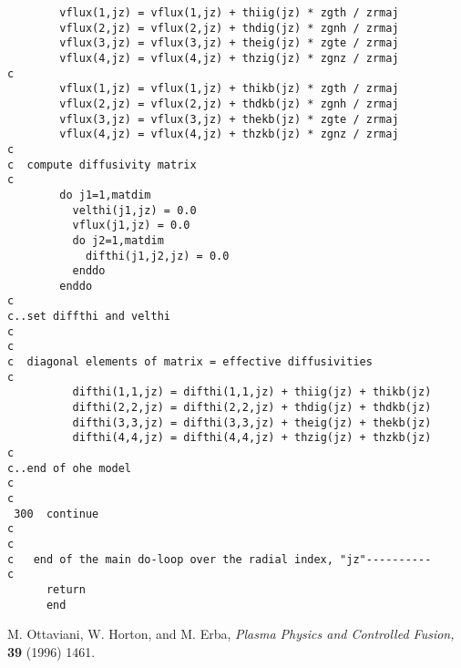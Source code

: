 \begin{verbatim}
        vflux(1,jz) = vflux(1,jz) + thiig(jz) * zgth / zrmaj
        vflux(2,jz) = vflux(2,jz) + thdig(jz) * zgnh / zrmaj
        vflux(3,jz) = vflux(3,jz) + theig(jz) * zgte / zrmaj
        vflux(4,jz) = vflux(4,jz) + thzig(jz) * zgnz / zrmaj
c
        vflux(1,jz) = vflux(1,jz) + thikb(jz) * zgth / zrmaj
        vflux(2,jz) = vflux(2,jz) + thdkb(jz) * zgnh / zrmaj
        vflux(3,jz) = vflux(3,jz) + thekb(jz) * zgte / zrmaj
        vflux(4,jz) = vflux(4,jz) + thzkb(jz) * zgnz / zrmaj
c
c  compute diffusivity matrix
c
        do j1=1,matdim
          velthi(j1,jz) = 0.0
          vflux(j1,jz) = 0.0
          do j2=1,matdim
            difthi(j1,j2,jz) = 0.0
          enddo
        enddo
c
c..set diffthi and velthi
c
c
c  diagonal elements of matrix = effective diffusivities
c
          difthi(1,1,jz) = difthi(1,1,jz) + thiig(jz) + thikb(jz)
          difthi(2,2,jz) = difthi(2,2,jz) + thdig(jz) + thdkb(jz)
          difthi(3,3,jz) = difthi(3,3,jz) + theig(jz) + thekb(jz)
          difthi(4,4,jz) = difthi(4,4,jz) + thzig(jz) + thzkb(jz)
c
c..end of ohe model
c
c
 300  continue
c
c
c   end of the main do-loop over the radial index, "jz"----------
c
      return
      end
\end{verbatim}
 

\begin{thebibliography}{99}

M. Ottaviani, W. Horton, and M. Erba,
{\em Plasma Physics and Controlled Fusion,} {\bf 39} (1996) 1461.

\end{thebibliography}










